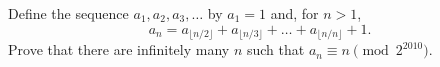 Define the sequence $a_1, a_2, a_3, \ldots$ by $a_1 = 1$ and, for $n > 1$, \[a_n = a_{\lfloor n/2 \rfloor} + a_{\lfloor n/3 \rfloor} + \ldots + a_{\lfloor n/n \rfloor} + 1.\] Prove that there are infinitely many $n$ such that $a_n \equiv n \pmod{2^{2010}}$.